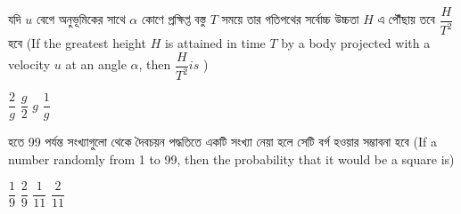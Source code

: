 \documentclass[addpoints]{exam}
\begin{document}
\begin{questions}
\begin{oneparchoices}
\end{oneparchoices}

\question   যদি $ u $ বেগে অনুভূমিকের সাথে $ \alpha $ কোণে প্রক্ষিপ্ত বস্তু $ T $ সময়ে তার গতিপথের সর্বোচ্চ উচ্চতা $ H $ এ পৌঁছায় তবে $ \dfrac{H}{T^2} $ হবে (If the greatest height $ H $ is attained in time $ T $ by a body projected with  a velocity $ u $ at an angle $ \alpha $, then $ \dfrac{H}{T^2} is $  )

\begin{oneparchoices}
\choice $ \dfrac{2}{g} $
\choice $ \dfrac{g}{2} $
\choice $ g $
\choice $ \dfrac{1}{g} $

\end{oneparchoices}

  হতে 99 পর্যন্ত সংখ্যাগুলো থেকে দৈবচয়ন পদ্ধতিতে একটি সংখ্যা নেয়া হলে সেটি বর্গ হওয়ার সম্ভাবনা হবে (If a number randomly from 1 to 99, then the probability that it would be a square is) 

\begin{oneparchoices}
\choice $ \dfrac{1}{9} $
\choice $ \dfrac{2}{9} $
\choice $ \dfrac{1}{11} $
\choice $ \dfrac{2}{11} $

\end{oneparchoices}

     






\end{questions}
\end{document}

